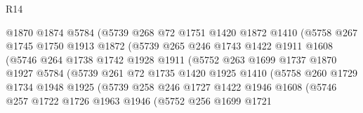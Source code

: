 \begin{lexlean}{R14}
\begin{coremodule}
                        @1870
                        @1874
                        @5784
                        (@5739
                          @268
                          @72
                          @1751
                          @1420
                          @1872
                          @1410
                          (@5758
                            @267
                            @1745
                            @1750
                            @1913
                            @1872
                            (@5739
                              @265
                              @246
                              @1743
                              @1422
                              @1911
                              @1608
                              (@5746
                                @264
                                @1738
                                @1742
                                @1928
                                @1911
                                (@5752
                                  @263
                                  @1699
                                  @1737
                                  @1870
                                  @1927
                                  @5784
                                  (@5739
                                    @261
                                    @72
                                    @1735
                                    @1420
                                    @1925
                                    @1410
                                    (@5758
                                      @260
                                      @1729
                                      @1734
                                      @1948
                                      @1925
                                      (@5739
                                        @258
                                        @246
                                        @1727
                                        @1422
                                        @1946
                                        @1608
                                        (@5746
                                          @257
                                          @1722
                                          @1726
                                          @1963
                                          @1946
                                          (@5752
                                            @256
                                            @1699
                                            @1721

\end{coremodule}
\end{lexlean}
